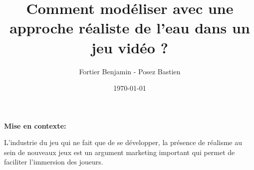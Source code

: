 \documentclass[aspectratio=43]{beamer}
\title{Comment modéliser avec une approche réaliste de l’eau dans un jeu vidéo ?}
\author{Fortier Benjamin - Posez Bastien}
\date{\today}
\begin{document}
\huge
\maketitle

\newpage
\thispagestyle{landscape}
\vspace*{2pt}
\textbf{Mise en contexte:}
\begin{center}
    L’industrie du jeu qui ne fait que de se développer, la présence de réalisme au sein de nouveaux jeux est un argument marketing important qui permet de faciliter l’immersion des joueurs. 
\end{center}
\end{document}
